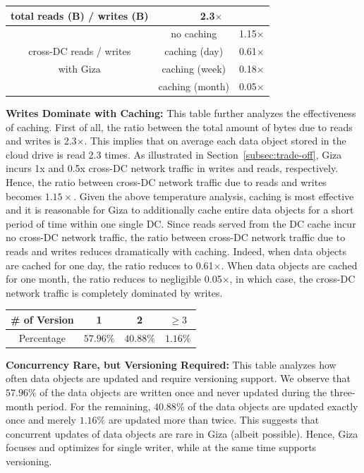 \begin{table}[h]
\centering
\begin{tabular}{|c||c|c|}
\hline \hline
total reads (B) / writes (B) 	& \multicolumn{2}{c|}{2.3$\times$}
\\ \hline \hline
	& no caching		& 1.15$\times$
\\ \cline{2-3}
cross-DC reads / writes
	& caching (day)		& 0.61$\times$ 
\\ \cline{2-3}
with Giza
	& caching (week)	& 0.18$\times$ 
\\ \cline{2-3}
	& caching (month)	& 0.05$\times$ 
\\ \hline \hline
\end{tabular}
\label{tab:caching}
\end{table}
{\bf Writes Dominate with Caching:} This table further analyzes the effectiveness of caching. First of all, the ratio between the total amount of bytes due to reads and writes is 2.3$\times$. This implies that on average each data object stored in the cloud drive is read 2.3 times. As illustrated in Section~\ref{subsec:trade-off}, Giza incurs 1x and 0.5x cross-DC network traffic in writes and reads, respectively. Hence, the ratio between cross-DC network traffic due to reads and writes becomes $1.15\times$. Given the above temperature analysis, caching is most effective and it is reasonable for Giza to additionally cache entire data objects for a short period of time within one single DC. Since reads served from the DC cache incur no cross-DC network traffic, the ratio between cross-DC network traffic due to reads and writes reduces dramatically with caching. Indeed, when data objects are cached for one day, the ratio reduces to 0.61$\times$. When data objects are cached for one month, the ratio reduces to negligible 0.05$\times$, in which case, the cross-DC network traffic is completely dominated by writes.

\begin{table}[h]
\centering
\begin{tabular}{c||c|c|c}
\# of Version 	& 	1				& 2					& $\ge 3$
\\ \hline
Percentage			& $57.96\%$	& $40.88\%$	& $1.16\%$
\end{tabular}
\label{tab:version}
\end{table}
{\bf Concurrency Rare, but Versioning Required:} This table analyzes how often data objects are updated and require versioning support. We observe that $57.96\%$ of the data objects are written once and never updated during the three-month period. For the remaining, $40.88\%$ of the data objects are updated exactly once and merely $1.16\%$ are updated more than twice. This suggests that concurrent updates of data objects are rare in Giza (albeit possible). Hence, Giza focuses and optimizes for single writer, while at the same time supports versioning.

